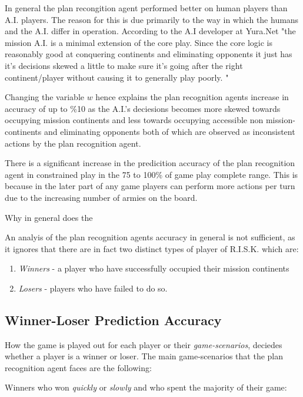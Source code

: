 \documentclass[parskip]{cs4rep}
\begin{document}
In general the plan recongition agent performed better on human players than A.I. players. The reason for this is due primarily to the way in which the humans and the A.I. differ in operation. According to the A.I developer at Yura.Net "the mission A.I. is a minimal extension of the core play. Since the core logic is reasonably good at conquering continents and eliminating opponents it just has it's decisions skewed a little to make sure it's going after the right continent/player without causing it to generally play poorly. "

Changing the variable $w$ hence explains the plan recognition agents increase in accuracy of up to \%10  as the A.I.'s deciesions becomes more skewed towards occupying mission continents and less towards occupying accessible non mission-continents and eliminating opponents both of which are observed as inconsistent actions by the plan recognition agent.

There is a significant increase in the predicition accuracy of the plan recognition agent in constrained play in the 75 to 100\% of game play complete range. This is because in the later part of any game players can perform more actions per turn due to the increasing number of armies on the board.

Why in general does the 



An analyis of the plan recognition agents accuracy in general is not sufficient, as it ignores that there are in fact two distinct types of player of R.I.S.K. which are:

\begin{enumerate}
\item
\textit{Winners} - a player who have successfully occupied their mission continents
\item
\textit{Losers} - players who have failed to do so.
\end{enumerate}

\subsection{Winner-Loser Prediction Accuracy}

How the game is played out for each player or their \textit{game-scenarios}, deciedes whether a player is a winner or loser.  The main game-scenarios that the plan recognition agent faces are the following:

Winners who won \textit{quickly} or \textit{slowly} and who spent the majority of their game:
\end{document}
